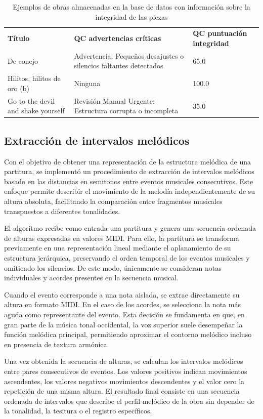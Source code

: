 \begin{table}[H]
\centering
\begin{tabular}{l p{5cm} p{3cm}}
\textbf{Título} & \textbf{QC advertencias críticas} & \textbf{QC puntuación integridad} \\
De conejo & Advertencia: Pequeños desajustes o silencios faltantes detectados & 65.0 \\
Hilitos, hilitos de oro (b) & Ninguna & 100.0 \\
Go to the devil and shake yourself & Revisión Manual Urgente: Estructura corrupta o incompleta & 35.0 \\
\end{tabular}
\caption{Ejemplos de obras almacenadas en la base de datos con información sobre la integridad de las piezas}
\end{table}

\subsection{Extracción de intervalos melódicos}
Con el objetivo de obtener una representación de la estructura melódica de una partitura, se implementó un procedimiento de extracción de intervalos melódicos basado en las distancias en semitonos entre eventos musicales consecutivos. Este enfoque permite describir el movimiento de la melodía independientemente de su altura absoluta, facilitando la comparación entre fragmentos musicales transpuestos a diferentes tonalidades.

El algoritmo recibe como entrada una partitura y genera una secuencia ordenada de alturas expresadas en valores MIDI. Para ello, la partitura se transforma previamente en una representación lineal mediante el aplanamiento de su estructura jerárquica, preservando el orden temporal de los eventos musicales y omitiendo los silencios. De este modo, únicamente se consideran notas individuales y acordes presentes en la secuencia musical.

Cuando el evento corresponde a una nota aislada, se extrae directamente su altura en formato MIDI. En el caso de los acordes, se selecciona la nota más aguda como representante del evento. Esta decisión se fundamenta en que, en gran parte de la música tonal occidental, la voz superior suele desempeñar la función melódica principal, permitiendo aproximar el contorno melódico incluso en presencia de textura armónica.

Una vez obtenida la secuencia de alturas, se calculan los intervalos melódicos entre pares consecutivos de eventos. Los valores positivos indican movimientos ascendentes, los valores negativos movimientos descendentes y el valor cero la repetición de una misma altura. El resultado final consiste en una secuencia ordenada de intervalos que describe el perfil melódico de la obra sin depender de la tonalidad, la tesitura o el registro específicos.

